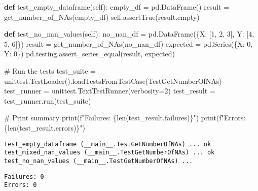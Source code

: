 \documentclass[
  letterpaper,
  DIV=11,
  numbers=noendperiod]{scrartcl}
\newenvironment{Shaded}{\begin{snugshade}}{\end{snugshade}}
\newcommand{\BuiltInTok}[1]{\textcolor[rgb]{0.00,0.23,0.31}{#1}}
\newcommand{\CommentTok}[1]{\textcolor[rgb]{0.37,0.37,0.37}{#1}}
\newcommand{\DecValTok}[1]{\textcolor[rgb]{0.68,0.00,0.00}{#1}}
\newcommand{\KeywordTok}[1]{\textcolor[rgb]{0.00,0.23,0.31}{\textbf{#1}}}
\newcommand{\NormalTok}[1]{\textcolor[rgb]{0.00,0.23,0.31}{#1}}
\newcommand{\OperatorTok}[1]{\textcolor[rgb]{0.37,0.37,0.37}{#1}}
\newcommand{\SpecialCharTok}[1]{\textcolor[rgb]{0.37,0.37,0.37}{#1}}
\newcommand{\SpecialStringTok}[1]{\textcolor[rgb]{0.13,0.47,0.30}{#1}}
\newcommand{\StringTok}[1]{\textcolor[rgb]{0.13,0.47,0.30}{#1}}
\newcommand{\VariableTok}[1]{\textcolor[rgb]{0.07,0.07,0.07}{#1}}
\begin{document}
\begin{Shaded}
\begin{Highlighting}[]
    \KeywordTok{def}\NormalTok{ test\_empty\_dataframe(}\VariableTok{self}\NormalTok{):}
\NormalTok{        empty\_df }\OperatorTok{=}\NormalTok{ pd.DataFrame()}
\NormalTok{        result }\OperatorTok{=}\NormalTok{ get\_number\_of\_NAs(empty\_df)}
        \VariableTok{self}\NormalTok{.assertTrue(result.empty)}

    \KeywordTok{def}\NormalTok{ test\_no\_nan\_values(}\VariableTok{self}\NormalTok{):}
\NormalTok{        no\_nan\_df }\OperatorTok{=}\NormalTok{ pd.DataFrame(\{}\StringTok{\textquotesingle{}X\textquotesingle{}}\NormalTok{: [}\DecValTok{1}\NormalTok{, }\DecValTok{2}\NormalTok{, }\DecValTok{3}\NormalTok{], }\StringTok{\textquotesingle{}Y\textquotesingle{}}\NormalTok{: [}\DecValTok{4}\NormalTok{, }\DecValTok{5}\NormalTok{, }\DecValTok{6}\NormalTok{]\})}
\NormalTok{        result }\OperatorTok{=}\NormalTok{ get\_number\_of\_NAs(no\_nan\_df)}
\NormalTok{        expected }\OperatorTok{=}\NormalTok{ pd.Series(\{}\StringTok{\textquotesingle{}X\textquotesingle{}}\NormalTok{: }\DecValTok{0}\NormalTok{, }\StringTok{\textquotesingle{}Y\textquotesingle{}}\NormalTok{: }\DecValTok{0}\NormalTok{\})}
\NormalTok{        pd.testing.assert\_series\_equal(result, expected)}

\CommentTok{\# Run the tests}
\NormalTok{test\_suite }\OperatorTok{=}\NormalTok{ unittest.TestLoader().loadTestsFromTestCase(TestGetNumberOfNAs)}
\NormalTok{test\_runner }\OperatorTok{=}\NormalTok{ unittest.TextTestRunner(verbosity}\OperatorTok{=}\DecValTok{2}\NormalTok{)}
\NormalTok{test\_result }\OperatorTok{=}\NormalTok{ test\_runner.run(test\_suite)}

\CommentTok{\# Print summary}
\BuiltInTok{print}\NormalTok{(}\SpecialStringTok{f"Failures: }\SpecialCharTok{\{}\BuiltInTok{len}\NormalTok{(test\_result.failures)}\SpecialCharTok{\}}\SpecialStringTok{"}\NormalTok{)}
\BuiltInTok{print}\NormalTok{(}\SpecialStringTok{f"Errors: }\SpecialCharTok{\{}\BuiltInTok{len}\NormalTok{(test\_result.errors)}\SpecialCharTok{\}}\SpecialStringTok{"}\NormalTok{)}
\end{Highlighting}
\end{Shaded}

\begin{verbatim}
test_empty_dataframe (__main__.TestGetNumberOfNAs) ... ok
test_mixed_nan_values (__main__.TestGetNumberOfNAs) ... ok
test_no_nan_values (__main__.TestGetNumberOfNAs) ... 
\end{verbatim}

\begin{verbatim}
Failures: 0
Errors: 0
\end{verbatim}
\end{document}
